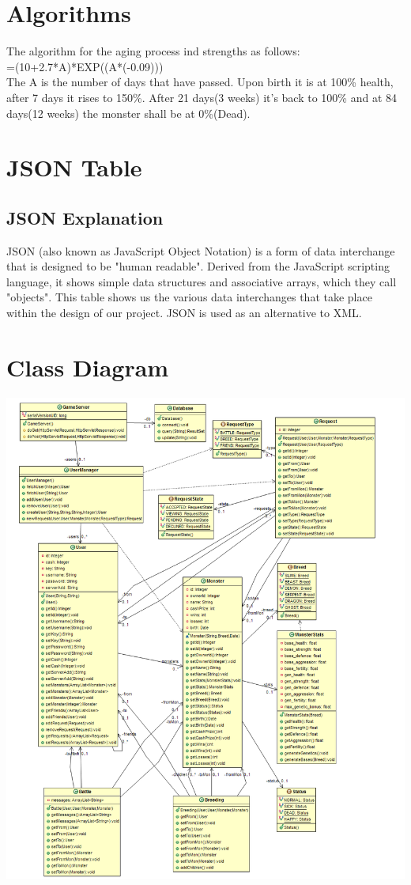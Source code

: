 \documentclass{project}
\begin{document}
\section{Algorithms}
The algorithm for the aging process ind strengths as follows:\\
=(10+2.7*A)*EXP((A*(-0.09)))\\
The A is the number of days that have passed. Upon birth it is at 100\% health, after 7 days it rises to 150\%. After 21 days(3 weeks) it's back to 100\% and at 84 days(12 weeks) the monster shall be at 0\%(Dead). 

\section{JSON Table}


\subsection{JSON Explanation}
JSON (also known as JavaScript Object Notation) is a form of data interchange that is designed to be "human readable". Derived from the JavaScript scripting language, it shows simple data structures and associative arrays, which they call "objects". This table shows us the various data interchanges that take place within the design of our project.  JSON is used as an alternative to XML.

\section{Class Diagram}
\includegraphics[scale=0.40]{MonsterDiagram.png}
\end{document}
